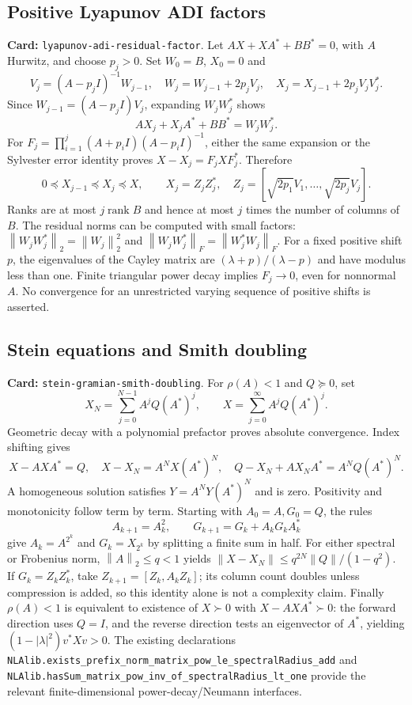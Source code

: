 \documentclass[11pt,a4paper]{article}
\newcommand{\norm}[1]{\left\lVert#1\right\rVert}
\DeclareMathOperator{\rank}{rank}
\DeclareRobustCommand{\code}[1]{{\footnotesize\urlstyle{tt}\nolinkurl{#1}}}
\begin{document}
\subsection{Positive Lyapunov ADI factors}
\label{route:lyapunov-adi-residual-factor}
\textbf{Card:} \code{lyapunov-adi-residual-factor}.
Let $AX+XA^*+BB^*=0$, with $A$ Hurwitz, and choose $p_j>0$.
Set $W_0=B$, $X_0=0$ and
\[
 V_j=(A-p_jI)^{-1}W_{j-1},\quad
 W_j=W_{j-1}+2p_jV_j,\quad
 X_j=X_{j-1}+2p_jV_jV_j^*.
\]
Since $W_{j-1}=(A-p_jI)V_j$, expanding $W_jW_j^*$ shows
\[
 AX_j+X_jA^*+BB^*=W_jW_j^*. \tag{G4}
\]
For $F_j=\prod_{i=1}^j(A+p_iI)(A-p_iI)^{-1}$, either the same expansion
or the Sylvester error identity proves
$X-X_j=F_jXF_j^*$. Therefore
\[
 0\preceq X_{j-1}\preceq X_j\preceq X,\qquad
 X_j=Z_jZ_j^*,\quad Z_j=[\sqrt{2p_1}V_1,\ldots,\sqrt{2p_j}V_j].
\]
Ranks are at most $j\rank B$ and hence at most $j$ times the number of
columns of $B$. The residual norms can be computed with small factors:
$\norm{W_jW_j^*}_2=\norm{W_j}_2^2$ and
$\norm{W_jW_j^*}_F=\norm{W_j^*W_j}_F$.
For a fixed positive shift $p$, the eigenvalues of the Cayley matrix are
$(\lambda+p)/(\lambda-p)$ and have modulus less than one. Finite
triangular power decay implies $F_j\to0$, even for nonnormal $A$.
No convergence for an unrestricted varying sequence of positive shifts
is asserted.

\subsection{Stein equations and Smith doubling}
\label{route:stein-gramian-smith-doubling}
\textbf{Card:} \code{stein-gramian-smith-doubling}.
For $\rho(A)<1$ and $Q\succeq0$, set
\[
 X_N=\sum_{j=0}^{N-1}A^jQ(A^*)^j,\qquad
 X=\sum_{j=0}^{\infty}A^jQ(A^*)^j.
\]
Geometric decay with a polynomial prefactor proves absolute convergence.
Index shifting gives
\[
 X-AXA^*=Q,\quad X-X_N=A^NX(A^*)^N,\quad
 Q-X_N+AX_NA^*=A^NQ(A^*)^N. \tag{G5}
\]
A homogeneous solution satisfies $Y=A^NY(A^*)^N$ and is zero. Positivity
and monotonicity follow term by term. Starting with $A_0=A,G_0=Q$, the rules
\[
 A_{k+1}=A_k^2,\qquad G_{k+1}=G_k+A_kG_kA_k^*
\]
give $A_k=A^{2^k}$ and $G_k=X_{2^k}$ by splitting a finite sum in half.
For either spectral or Frobenius norm, $\norm A_2\le q<1$ yields
$\norm{X-X_N}\le q^{2N}\norm Q/(1-q^2)$.
If $G_k=Z_kZ_k^*$, take $Z_{k+1}=[Z_k,A_kZ_k]$; its column count doubles
unless compression is added, so this identity alone is not a complexity
claim. Finally $\rho(A)<1$ is equivalent to existence of $X\succ0$ with
$X-AXA^*\succ0$: the forward direction uses $Q=I$, and the reverse direction
tests an eigenvector of $A^*$, yielding $(1-|\lambda|^2)v^*Xv>0$.
The existing declarations
\code{NLAlib.exists_prefix_norm_matrix_pow_le_spectralRadius_add} and
\code{NLAlib.hasSum_matrix_pow_inv_of_spectralRadius_lt_one}
provide the relevant finite-dimensional power-decay/Neumann interfaces.
\end{document}
